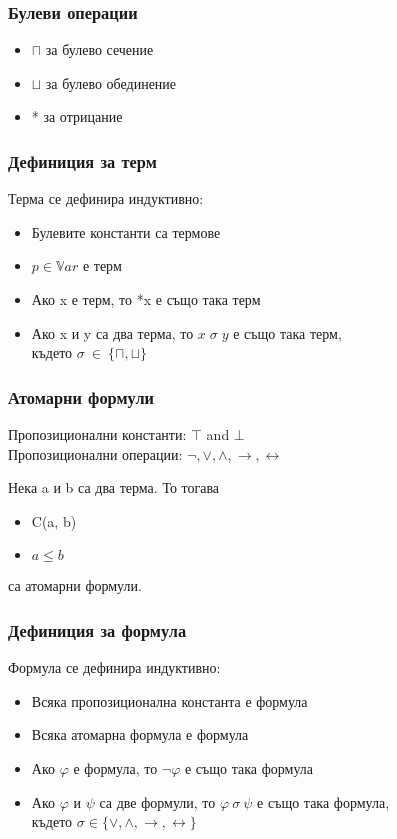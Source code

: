 \documentclass{beamer}
\begin{document}
\begin{frame}\frametitle{Булеви операции}
	\begin{itemize}
		\item $\sqcap$ за булево сечение
		\item $\sqcup$ за булево обединение
		\item * за отрицание
	\end{itemize}
\end{frame}

\begin{frame}\frametitle{Дефиниция за терм}
Терма се дефинира индуктивно:
	\begin{itemize}
		\item Булевите константи са термове
		\item $p \in \mathbb{V}ar$ е терм
		\item Ако x е терм, то *x е също така терм
		\item Ако x и y са два терма, то $x \; \sigma \; y $ е също така терм,\\
				където $\sigma \: \in \: \{\sqcap, \sqcup\}$
	\end{itemize}
\end{frame}

\begin{frame}\frametitle{Атомарни формули}
	Пропозиционални константи: $\top$ and $\bot$ \\
	\vspace{10px}
	Пропозиционални операции: $\neg, \vee, \wedge, \rightarrow, \leftrightarrow$
	\vspace{10px}

	Нека a и b са два терма. То тогава 
	\begin{itemize}
		\item C(a, b)
		\item $a \le b$
	\end{itemize}
	са атомарни формули.
\end{frame}

\begin{frame}\frametitle{Дефиниция за формула}
Формула се дефинира индуктивно:
		\begin{itemize}
			\item Всяка пропозиционална константа е формула
			\item Всяка атомарна формула е формула
			\item Ако $\varphi$ е формула, то $\neg{\varphi}$ е също така формула
			\item Ако $\varphi$ и $\psi$ са две формули, то $\varphi \: \sigma \: \psi $ е също така формула,\\
				където $\sigma \in \{\vee, \wedge, \rightarrow, \leftrightarrow\}$
		\end{itemize}
\end{frame}
\end{document}

